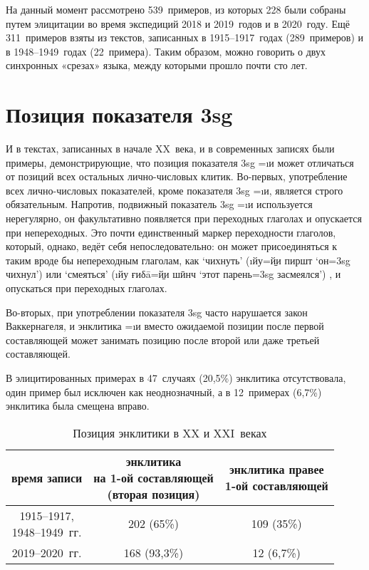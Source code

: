 На данный момент рассмотрено 539~примеров, из которых 228 были собраны путем элицитации во время экспедиций 2018 и 2019~годов и в 2020~году. Ещё 311~примеров взяты из текстов, записанных в 1915–1917~годах \parencite{zarubin1960} (289~примеров) и в 1948–1949~годах \parencite{sokolova1953} (22~примера). Таким образом, можно говорить о двух синхронных «срезах» языка, между которыми прошло почти сто лет.

\section{Позиция показателя {\sc 3sg}} \label{clit-position}

И в текстах, записанных в начале XX~века, и в современных записях были примеры, демонстрирующие, что позиция показателя {\sc 3sg} =\i{и} может отличаться от позиций всех остальных лично-числовых клитик. Во-первых, употребление всех лично-числовых показателей, кроме показателя {\sc 3sg} =\i{и}, является строго обязательным. Напротив, подвижный показатель {\sc 3sg} =\i{и} используется нерегулярно, он факультативно появляется при переходных глаголах и опускается при непереходных. Это почти единственный маркер переходности глаголов, который, однако, ведёт себя непоследовательно: он может присоединяться к таким вроде бы непереходным глаголам, как ‘чихнуть’ (\i{йу=\b{йи} пиршт} ‘он={\sc 3sg} чихнул’) или ‘смеяться’ (\i{йу ғиδā=\b{йи} шӣнч} ‘этот парень={\sc 3sg} засмеялся’) \parencite[236]{edelman_yusufbekov1999_shughni}, и опускаться при переходных глаголах.

Во-вторых, при употреблении показателя {\sc 3sg} часто нарушается закон Ваккернагеля, и энклитика =\i{и} вместо ожидаемой позиции после первой составляющей может занимать позицию после второй или даже третьей составляющей.

В элицитированных примерах в 47~случаях (20,5\%) энклитика отсутствовала, один пример был исключен как неоднозначный, а в 12~примерах (6,7\%) энклитика была смещена вправо.

\begin{table}[H]
 \centering
 \caption{Позиция энклитики в XX и XXI~веках}
 \smallskip
 \label{tab:clit1}
 \begin{tabular}{c|cc} \toprule
 время записи & \makecell{энклитика\\на 1-ой составляющей\\(вторая позиция)} & \makecell{энклитика правее\\1-ой составляющей} \\ \midrule
 \makecell{1915–1917,\\1948–1949~гг.} & 202 (65\%) & 109 (35\%) \\
 2019–2020~гг. & 168 (93,3\%) & 12 (6,7\%) \\ \bottomrule
 \end{tabular}
\end{table}

